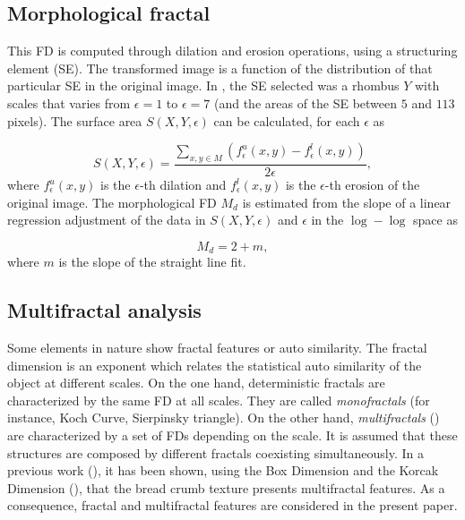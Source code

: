 \documentclass[oneside,a4paper,english,links]{amca}
\begin{document}
\subsection{Morphological fractal}
This FD is computed through dilation and erosion operations, using a structuring element (SE). The transformed image is a function of the distribution of that particular SE in the original image.  In \cite{Gonzales2008}, the SE selected was a rhombus $Y$ with scales that varies from $\epsilon = 1$ to $\epsilon = 7$ (and the areas of the SE between $5$ and $113$ pixels). The surface area $S(X,Y,\epsilon)$ can be calculated, for each $\epsilon$ as

\begin{equation}
S(X,Y,\epsilon) = \frac{\sum_{x,y \in M} (f_{\epsilon}^{u}(x,y) - f_{\epsilon}^{l}(x,y))}{2\epsilon},
\label{eqn:eqn2}
\end{equation}
\noindent
where $f_{\epsilon}^{u}(x,y)$ is the $\epsilon$-th dilation and $f_{\epsilon}^{l}(x,y)$ is the $\epsilon$-th erosion of the original image. The morphological FD $M_{d}$ is estimated from the slope of a linear regression adjustment of the data in $S(X,Y,\epsilon)$ and $\epsilon$ in the $\log-\log$ space as

\begin{equation}
M_{d} = 2 + m,
\label{eqn:eqn3}
\end{equation}
\noindent
where $m$ is the slope of the straight line fit.

\subsection{Multifractal analysis}
Some elements in nature show fractal features or auto similarity. The fractal dimension is an exponent which relates the statistical auto similarity of the object at different scales. On the one hand, deterministic fractals are characterized by the same FD at all scales. They are called {\em monofractals} (for instance, Koch Curve, Sierpinsky triangle). On the other hand, {\em multifractals} (\cite{Mandelbrot89}) are characterized by a set of FDs depending on the scale. It is assumed that these structures are composed by different fractals coexisting simultaneously. In a previous work (\cite{Baravalle2012}), it has been shown, using the Box Dimension and the Korcak Dimension (\cite{Imre11}), that the bread crumb texture presents multifractal features. As a consequence, fractal and multifractal features are considered in the present paper.
\end{document}
